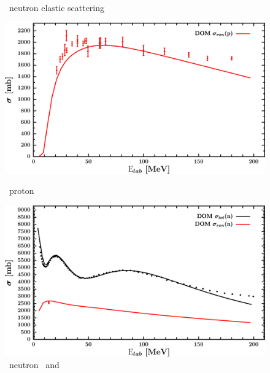 \begin{figure}[hbtp]
\begin{minipage}{0.47\textwidth}
        \caption*{\pbEight\ neutron elastic scattering}
        \label{DOMFitData_pb208_neutron_elastic}
    \end{minipage}
\end{figure}
\vspace{0.70in}
\begin{figure}[hbtp]
    \centering
    \begin{minipage}{0.47\textwidth}
        \centering
        \includegraphics[width=\linewidth]{figures/pb208_protonInelastic.png}
        \caption*{\pbEight\ proton \rxn}
        \label{DOMFitData_pb208_proton_inelastic}
    \end{minipage}\hspace{6pt}
    \begin{minipage}{0.47\textwidth}
        \centering
        \includegraphics[width=\textwidth]{figures/pb208_neutronInelastic.png}
        \caption*{\pbEight\ neutron \rxn\ and \tot}
        \label{DOMFitData_pb208_neutron_inelastic}
    \end{minipage}
\end{figure}
\afterpage{\clearpage}

